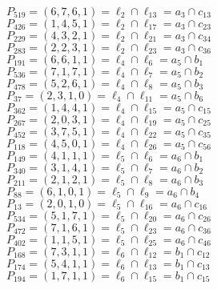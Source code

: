 \documentclass{article}
\begin{document}
{\begin{multicols}{2}
$P_{519} = ( 6, 7, 6, 1 ) = \ell_{2} \cap \ell_{13}  = a_{3} \cap c_{13}$\\
$P_{426} = ( 1, 4, 5, 1 ) = \ell_{2} \cap \ell_{17}  = a_{3} \cap c_{23}$\\
$P_{229} = ( 4, 3, 2, 1 ) = \ell_{2} \cap \ell_{21}  = a_{3} \cap c_{34}$\\
$P_{283} = ( 2, 2, 3, 1 ) = \ell_{2} \cap \ell_{23}  = a_{3} \cap c_{36}$\\
$P_{191} = ( 6, 6, 1, 1 ) = \ell_{4} \cap \ell_{6}  = a_{5} \cap b_{1}$\\
$P_{536} = ( 7, 1, 7, 1 ) = \ell_{4} \cap \ell_{7}  = a_{5} \cap b_{2}$\\
$P_{478} = ( 5, 2, 6, 1 ) = \ell_{4} \cap \ell_{8}  = a_{5} \cap b_{3}$\\
$P_{37} = ( 2, 3, 1, 0 ) = \ell_{4} \cap \ell_{11}  = a_{5} \cap b_{6}$\\
$P_{362} = ( 1, 4, 4, 1 ) = \ell_{4} \cap \ell_{15}  = a_{5} \cap c_{15}$\\
$P_{267} = ( 2, 0, 3, 1 ) = \ell_{4} \cap \ell_{19}  = a_{5} \cap c_{25}$\\
$P_{452} = ( 3, 7, 5, 1 ) = \ell_{4} \cap \ell_{22}  = a_{5} \cap c_{35}$\\
$P_{118} = ( 4, 5, 0, 1 ) = \ell_{4} \cap \ell_{26}  = a_{5} \cap c_{56}$\\
$P_{149} = ( 4, 1, 1, 1 ) = \ell_{5} \cap \ell_{6}  = a_{6} \cap b_{1}$\\
$P_{340} = ( 3, 1, 4, 1 ) = \ell_{5} \cap \ell_{7}  = a_{6} \cap b_{2}$\\
$P_{211} = ( 2, 1, 2, 1 ) = \ell_{5} \cap \ell_{8}  = a_{6} \cap b_{3}$\\
$P_{88} = ( 6, 1, 0, 1 ) = \ell_{5} \cap \ell_{9}  = a_{6} \cap b_{4}$\\
$P_{13} = ( 2, 0, 1, 0 ) = \ell_{5} \cap \ell_{16}  = a_{6} \cap c_{16}$\\
$P_{534} = ( 5, 1, 7, 1 ) = \ell_{5} \cap \ell_{20}  = a_{6} \cap c_{26}$\\
$P_{472} = ( 7, 1, 6, 1 ) = \ell_{5} \cap \ell_{23}  = a_{6} \cap c_{36}$\\
$P_{402} = ( 1, 1, 5, 1 ) = \ell_{5} \cap \ell_{25}  = a_{6} \cap c_{46}$\\
$P_{168} = ( 7, 3, 1, 1 ) = \ell_{6} \cap \ell_{12}  = b_{1} \cap c_{12}$\\
$P_{174} = ( 5, 4, 1, 1 ) = \ell_{6} \cap \ell_{13}  = b_{1} \cap c_{13}$\\
$P_{194} = ( 1, 7, 1, 1 ) = \ell_{6} \cap \ell_{15}  = b_{1} \cap c_{15}$\\

\end{multicols}}
\end{document}
